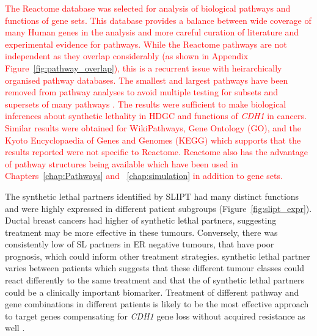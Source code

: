 \textcolor{red}{
The Reactome \citep{Reactome} database was selected for analysis of biological pathways and functions of gene sets. This database provides a balance between wide coverage of many Human genes in the analysis and more careful curation of literature and experimental evidence for pathways. While the Reactome pathways are not independent as they overlap considerably (as shown in Appendix Figure~\ref{fig:pathway_overlap}), this is a recurrent issue with heirarchically organised pathway databases. The smallest and largest pathways have been removed from pathway analyses to avoid multiple testing for subsets and supersets of many pathways \citep[as performed by others such as][]{genesetdb}. The results were sufficient to make biological inferences about synthetic lethality in \gls{HDGC} and functions of \textit{CDH1} in cancers. Similar results were obtained for WikiPathways, Gene Ontology (GO), and the Kyoto Encyclopaedia of Genes and Genomes (KEGG) which supports that the results reported were not specific to Reactome. Reactome also has the advantage of pathway structures being available which have been used in Chapters~\ref{chap:Pathways} and ~\ref{chap:simulation} in addition to gene sets.
}

The \gls{synthetic lethal} partners identified by \gls{SLIPT} had many distinct functions and were highly expressed in different patient subgroups (Figure~\ref{fig:slipt_expr}). %
Ductal breast cancers had higher  of \gls{synthetic lethal} partners, suggesting treatment may be more effective in these tumours.  Conversely, there was consistently low  of SL partners in \gls{ER} negative tumours, that have poor prognosis, which could inform other treatment strategies. %
\Gls{synthetic lethal} partner  varies between patients which suggests that these different tumour classes could react differently to the same treatment and that the  of synthetic lethal partners could be a clinically important biomarker. Treatment of different \gls{pathway} and gene combinations in different patients is likely to be the most effective approach to target genes compensating for \textit{CDH1} gene loss without acquired resistance as well \citep{Lord2014}. 

